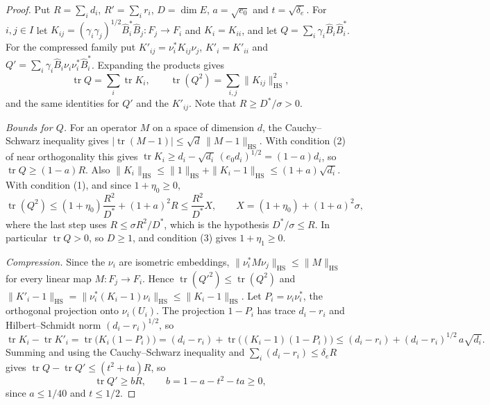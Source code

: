 \begin{proof}
Put $R=\sum_id_i$, $R'=\sum_ir_i$, $D=\dim E$, $a=\sqrt{e_0}$ and $t=\sqrt{\delta_e}$. For
$i,j\in I$ let $K_{ij}=(\gamma_i\gamma_j)^{1/2}\hat B_i^*\hat B_j:F_j\to F_i$ and $K_i=K_{ii}$,
and let $Q=\sum_i\gamma_i\hat B_i\hat B_i^*$. For the compressed family put
$K'_{ij}=\nu_i^*K_{ij}\nu_j$, $K'_i=K'_{ii}$ and $Q'=\sum_i\gamma_i\hat B_i\nu_i\nu_i^*\hat B_i^*$.
Expanding the products gives
\[
 \operatorname{tr}Q=\sum_i\operatorname{tr}K_i,\qquad
 \operatorname{tr}(Q^2)=\sum_{i,j}\|K_{ij}\|_{\mathrm{HS}}^2,
\]
and the same identities for $Q'$ and the $K'_{ij}$. Note that $R\geq D^*/\sigma>0$.

\emph{Bounds for $Q$.} For an operator $M$ on a space of dimension $d$, the Cauchy--Schwarz
inequality gives $|\operatorname{tr}(M-1)|\leq\sqrt d\,\|M-1\|_{\mathrm{HS}}$. With condition
(2) of near orthogonality this gives
$\operatorname{tr}K_i\geq d_i-\sqrt{d_i}\,(e_0d_i)^{1/2}=(1-a)d_i$, so
$\operatorname{tr}Q\geq(1-a)R$. Also
$\|K_i\|_{\mathrm{HS}}\leq\|1\|_{\mathrm{HS}}+\|K_i-1\|_{\mathrm{HS}}\leq(1+a)\sqrt{d_i}$. With
condition (1), and since $1+\eta_0\geq0$,
\[
 \operatorname{tr}(Q^2)\leq(1+\eta_0)\frac{R^2}{D^*}+(1+a)^2R\leq\frac{R^2}{D^*}X,
 \qquad X=(1+\eta_0)+(1+a)^2\sigma,
\]
where the last step uses $R\leq\sigma R^2/D^*$, which is the hypothesis $D^*/\sigma\leq R$. In
particular $\operatorname{tr}Q>0$, so $D\geq1$, and condition (3) gives $1+\eta_1\geq0$.

\emph{Compression.} Since the $\nu_i$ are isometric embeddings,
$\|\nu_i^*M\nu_j\|_{\mathrm{HS}}\leq\|M\|_{\mathrm{HS}}$ for every linear map $M:F_j\to F_i$. Hence
$\operatorname{tr}(Q'^2)\leq\operatorname{tr}(Q^2)$ and
$\|K'_i-1\|_{\mathrm{HS}}=\|\nu_i^*(K_i-1)\nu_i\|_{\mathrm{HS}}\leq\|K_i-1\|_{\mathrm{HS}}$. Let
$P_i=\nu_i\nu_i^*$, the orthogonal projection onto $\nu_i(U_i)$. The projection $1-P_i$ has
trace $d_i-r_i$ and Hilbert--Schmidt norm $(d_i-r_i)^{1/2}$, so
\[
 \operatorname{tr}K_i-\operatorname{tr}K'_i=\operatorname{tr}\big(K_i(1-P_i)\big)
 =(d_i-r_i)+\operatorname{tr}\big((K_i-1)(1-P_i)\big)
 \leq(d_i-r_i)+(d_i-r_i)^{1/2}\,a\sqrt{d_i}.
\]
Summing and using the Cauchy--Schwarz inequality and $\sum_i(d_i-r_i)\leq\delta_eR$ gives
$\operatorname{tr}Q-\operatorname{tr}Q'\leq(t^2+ta)R$, so
\[
 \operatorname{tr}Q'\geq bR,\qquad b=1-a-t^2-ta\geq0,
\]
since $a\leq1/40$ and $t\leq1/2$.


\end{proof}
